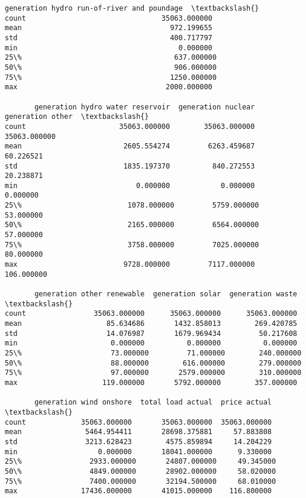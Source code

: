 \documentclass[11pt]{article}
\begin{document}
\begin{tcolorbox}[breakable, size=fbox, boxrule=.5pt, pad at break*=1mm, opacityfill=0]
\begin{Verbatim}[commandchars=\\\{\}]
       generation hydro run-of-river and poundage  \textbackslash{}
count                                35063.000000
mean                                   972.199655
std                                    400.717797
min                                      0.000000
25\%                                    637.000000
50\%                                    906.000000
75\%                                   1250.000000
max                                   2000.000000

       generation hydro water reservoir  generation nuclear  generation other  \textbackslash{}
count                      35063.000000        35063.000000      35063.000000
mean                        2605.554274         6263.459687         60.226521
std                         1835.197370          840.272553         20.238871
min                            0.000000            0.000000          0.000000
25\%                         1078.000000         5759.000000         53.000000
50\%                         2165.000000         6564.000000         57.000000
75\%                         3758.000000         7025.000000         80.000000
max                         9728.000000         7117.000000        106.000000

       generation other renewable  generation solar  generation waste  \textbackslash{}
count                35063.000000      35063.000000      35063.000000
mean                    85.634686       1432.858013        269.420785
std                     14.076987       1679.969434         50.217608
min                      0.000000          0.000000          0.000000
25\%                     73.000000         71.000000        240.000000
50\%                     88.000000        616.000000        279.000000
75\%                     97.000000       2579.000000        310.000000
max                    119.000000       5792.000000        357.000000

       generation wind onshore  total load actual  price actual  \textbackslash{}
count             35063.000000       35063.000000  35063.000000
mean               5464.954411       28698.375881     57.883808
std                3213.628423        4575.859894     14.204229
min                   0.000000       18041.000000      9.330000
25\%                2933.000000       24807.000000     49.345000
50\%                4849.000000       28902.000000     58.020000
75\%                7400.000000       32194.500000     68.010000
max               17436.000000       41015.000000    116.800000


\end{Verbatim}
\end{tcolorbox}
\end{document}
